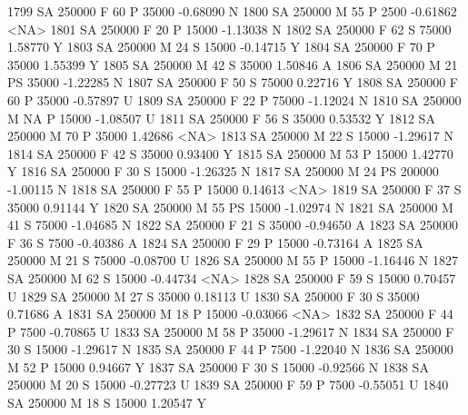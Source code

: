 \documentclass{article}
\begin{document}
\begin{Schunk}
\begin{Soutput}
1799     SA     250000   F  60         P  35000  -0.68090    N
1800     SA     250000   M  55         P   2500  -0.61862 <NA>
1801     SA     250000   F  20         P  15000  -1.13038    N
1802     SA     250000   F  62         S  75000   1.58770    Y
1803     SA     250000   M  24         S  15000  -0.14715    Y
1804     SA     250000   F  70         P  35000   1.55399    Y
1805     SA     250000   M  42         S  35000   1.50846    A
1806     SA     250000   M  21        PS  35000  -1.22285    N
1807     SA     250000   F  50         S  75000   0.22716    Y
1808     SA     250000   F  60         P  35000  -0.57897    U
1809     SA     250000   F  22         P  75000  -1.12024    N
1810     SA     250000   M  NA         P  15000  -1.08507    U
1811     SA     250000   F  56         S  35000   0.53532    Y
1812     SA     250000   M  70         P  35000   1.42686 <NA>
1813     SA     250000   M  22         S  15000  -1.29617    N
1814     SA     250000   F  42         S  35000   0.93400    Y
1815     SA     250000   M  53         P  15000   1.42770    Y
1816     SA     250000   F  30         S  15000  -1.26325    N
1817     SA     250000   M  24        PS 200000  -1.00115    N
1818     SA     250000   F  55         P  15000   0.14613 <NA>
1819     SA     250000   F  37         S  35000   0.91144    Y
1820     SA     250000   M  55        PS  15000  -1.02974    N
1821     SA     250000   M  41         S  75000  -1.04685    N
1822     SA     250000   F  21         S  35000  -0.94650    A
1823     SA     250000   F  36         S   7500  -0.40386    A
1824     SA     250000   F  29         P  15000  -0.73164    A
1825     SA     250000   M  21         S  75000  -0.08700    U
1826     SA     250000   M  55         P  15000  -1.16446    N
1827     SA     250000   M  62         S  15000  -0.44734 <NA>
1828     SA     250000   F  59         S  15000   0.70457    U
1829     SA     250000   M  27         S  35000   0.18113    U
1830     SA     250000   F  30         S  35000   0.71686    A
1831     SA     250000   M  18         P  15000  -0.03066 <NA>
1832     SA     250000   F  44         P   7500  -0.70865    U
1833     SA     250000   M  58         P  35000  -1.29617    N
1834     SA     250000   F  30         S  15000  -1.29617    N
1835     SA     250000   F  44         P   7500  -1.22040    N
1836     SA     250000   M  52         P  15000   0.94667    Y
1837     SA     250000   F  30         S  15000  -0.92566    N
1838     SA     250000   M  20         S  15000  -0.27723    U
1839     SA     250000   F  59         P   7500  -0.55051    U
1840     SA     250000   M  18         S  15000   1.20547    Y

\end{Soutput}
\end{Schunk}
\end{document}
